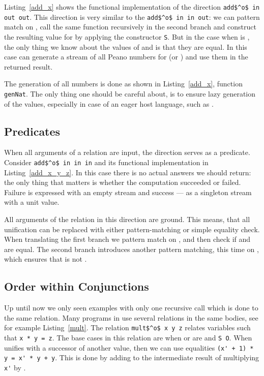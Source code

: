 Listing~\ref{add_x} shows the functional implementation of the direction \lstinline{add$^o$ in out out}.
This direction is very similar to the \lstinline{add$^o$ in in out}: we can pattern match on \x, call the same function recursively in the second \conde branch and construct the resulting value for \z by applying the constructor \lstinline{S}.
But in the case when \x is \zero, the only thing we know about the values of \y and \z is that they are equal.
In this case can generate a stream of all Peano numbers for \z (or \y) and use them in the returned result.

The generation of all numbers is done as shown in Listing~\ref{add_x}, function \lstinline{genNat}.
The only thing one should be careful about, is to ensure lazy generation of the values, especially in case of an eager host language, such as \ocaml.



\subsection{Predicates}

When all arguments of a relation are input, the direction serves as a predicate.
Consider \lstinline{add$^o$ in in in} and its functional implementation in Listing~\ref{add_x_y_z}.
In this case there is no actual answers we should return: the only thing that matters is whether the computation succeeded or failed.
Failure is expressed with an empty stream and success --- as a singleton stream with a unit value.

All arguments of the relation in this direction are ground.
This means, that all unification can be replaced with either pattern-matching or simple equality check.
When translating the first \conde branch we pattern match on \x, and then check if \y and \z are equal.
The second \conde branch introduces another pattern matching, this time on \z, which ensures that \z is not \zero.




\subsection{Order within Conjunctions}






Up until now we only seen examples with only one recursive call which is done to the same relation.
Many programs in \mk use several relations in the same bodies, see for example Listing~\ref{mult}.
The relation \lstinline{mult$^o$ x y z} relates variables such that \lstinline{x * y = z}.
The base cases in this relation are when \x or \y are \zero and \lstinline{S O}.
When \x unifies with a successor of another value, then we can use equalities \lstinline{(x' + 1) * y = x' * y + y}.
This is done by adding \y to the intermediate result of multiplying \lstinline{x'} by \y.

